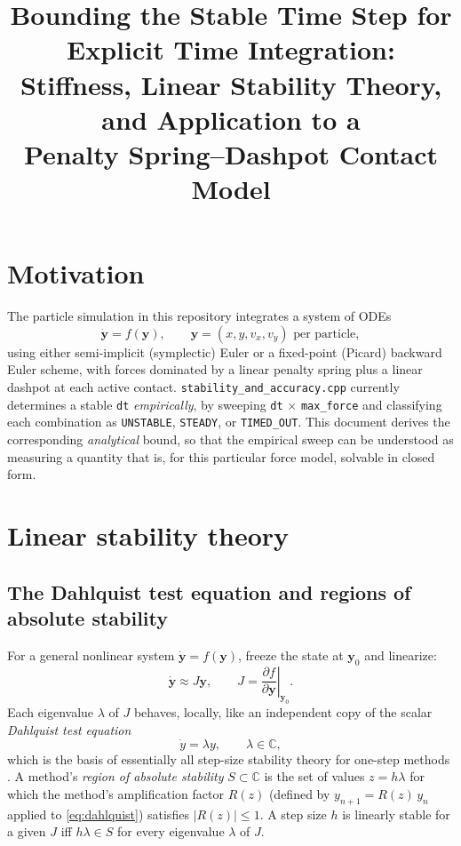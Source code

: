 \documentclass[11pt]{article}
\title{Bounding the Stable Time Step for Explicit Time Integration:\\
Stiffness, Linear Stability Theory, and Application to a\\
Penalty Spring--Dashpot Contact Model}
\author{}
\date{}
\begin{document}
\maketitle

\section{Motivation}

The particle simulation in this repository integrates a system of ODEs
\begin{equation}
  \dot{\mathbf{y}} = f(\mathbf{y}), \qquad \mathbf{y} = (x, y, v_x, v_y) \text{ per particle},
\end{equation}
using either semi-implicit (symplectic) Euler or a fixed-point (Picard) backward Euler
scheme, with forces dominated by a linear penalty spring plus a linear dashpot at each
active contact. \texttt{stability\_and\_accuracy.cpp} currently determines a stable
\texttt{dt} \emph{empirically}, by sweeping \texttt{dt} $\times$ \texttt{max\_force} and
classifying each combination as \texttt{UNSTABLE}, \texttt{STEADY}, or \texttt{TIMED\_OUT}.
This document derives the corresponding \emph{analytical} bound, so that the empirical
sweep can be understood as measuring a quantity that is, for this particular force model,
solvable in closed form.

\section{Linear stability theory}

\subsection{The Dahlquist test equation and regions of absolute stability}

For a general nonlinear system $\dot{\mathbf{y}} = f(\mathbf{y})$, freeze the state at
$\mathbf{y}_0$ and linearize:
\begin{equation}
  \dot{\mathbf{y}} \approx J \mathbf{y}, \qquad J = \left.\frac{\partial f}{\partial \mathbf{y}}\right|_{\mathbf{y}_0}.
\end{equation}
Each eigenvalue $\lambda$ of $J$ behaves, locally, like an independent copy of the scalar
\emph{Dahlquist test equation}
\begin{equation}
  \dot y = \lambda y, \qquad \lambda \in \mathbb{C},
  \label{eq:dahlquist}
\end{equation}
which is the basis of essentially all step-size stability theory for one-step methods
\cite{dahlquist1963}. A method's \emph{region of absolute stability} $S \subset \mathbb{C}$
is the set of values $z = h\lambda$ for which the method's amplification factor $R(z)$
(defined by $y_{n+1} = R(z)\, y_n$ applied to \eqref{eq:dahlquist}) satisfies $|R(z)| \le 1$.
A step size $h$ is linearly stable for a given $J$ iff $h\lambda \in S$ for every eigenvalue
$\lambda$ of $J$.
\end{document}
